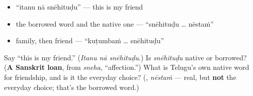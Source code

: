 \begin{itemize}
\raggedright
  \item \textquotedblleft{}itanu nā snēhituḍu\textquotedblright{} — this is my friend
  \item the borrowed word and the native one — \textquotedblleft{}snēhituḍu … nēstaṁ\textquotedblright{}
  \item family, then friend — \textquotedblleft{}kuṭumbaṁ … snēhituḍu\textquotedblright{}
\end{itemize}

\begin{tcolorbox}[breakable,colback=teal!4,colframe=teal!35!black,title={Before you move on}]
Say \textquotedblleft{}this is my friend.\textquotedblright{} (\emph{Itanu nā snēhituḍu}.) Is \emph{snēhituḍu} native or borrowed? (\textbf{A Sanskrit loan}, from \emph{sneha}, \textquotedblleft{}affection.\textquotedblright{}) What is Telugu's own native word for friendship, and is it the everyday choice? (\textbf{}, \emph{nēstaṁ} — real, but \textbf{not} the everyday choice; that's the borrowed word.)
\end{tcolorbox}
